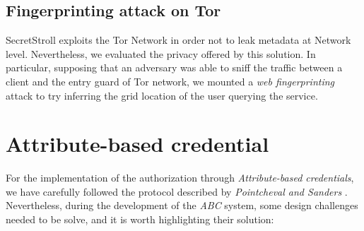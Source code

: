 \documentclass[10pt,conference,compsocconf]{IEEEtran}
\begin{document}
\subsection{Fingerprinting attack on Tor}
SecretStroll exploits the Tor Network in order not to leak metadata at Network level. Nevertheless, we
evaluated the privacy offered by this solution. In particular, supposing that an adversary was able to
sniff the traffic between a client and the entry guard of Tor network, we mounted a \textit{web fingerprinting}
attack to try inferring the grid location of the user querying the service.
\section{Attribute-based credential}
For the implementation of the authorization through \textit{Attribute-based
credentials}, we have carefully followed the protocol described by
\textit{Pointcheval and Sanders} \cite{PS_signature}. Nevertheless, during the
development of the \textit{ABC} system, some design challenges needed to be
solve, and it is worth highlighting their solution:
\end{document}
